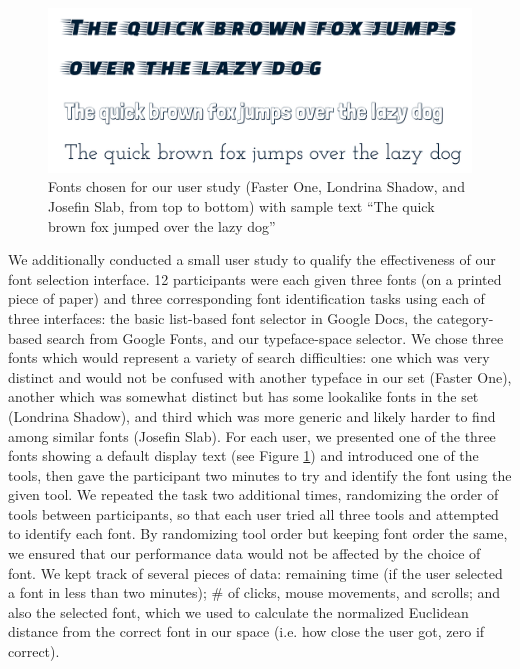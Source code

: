 \begin{figure}[h]
    \centering
    \includegraphics[width=\textwidth]{images/user-fonts.pdf}
    \caption{Fonts chosen for our user study (Faster One, Londrina Shadow, and Josefin Slab, from top to bottom) with sample text ``The quick brown fox jumped over the lazy dog''}
    \label{fig:user-fonts}
\end{figure}

We additionally conducted a small user study to qualify the effectiveness of our font selection interface. 12 participants were each given three fonts (on a printed piece of paper) and three corresponding font identification tasks using each of three interfaces: the basic list-based font selector in Google Docs, the category-based search from Google Fonts, and our typeface-space selector. We chose three fonts which would represent a variety of search difficulties: one which was very distinct and would not be confused with another typeface in our set (Faster One), another which was somewhat distinct but has some lookalike fonts in the set (Londrina Shadow), and third which was more generic and likely harder to find among similar fonts (Josefin Slab). For each user, we presented one of the three fonts showing a default display text (see Figure \ref{fig:user-fonts}) and introduced one of the tools, then gave the participant two minutes to try and identify the font using the given tool. We repeated the task two additional times, randomizing the order of tools between participants, so that each user tried all three tools and attempted to identify each font. By randomizing tool order but keeping font order the same, we ensured that our performance data would not be affected by the choice of font. We kept track of several pieces of data: remaining time (if the user selected a font in less than two minutes); \# of clicks, mouse movements, and scrolls; and also the selected font, which we used to calculate the normalized Euclidean distance from the correct font in our space (i.e. how close the user got, zero if correct).


